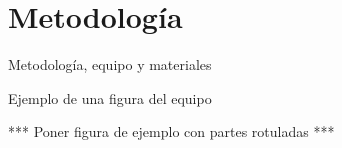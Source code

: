 \section{Metodología}
\label{sec:Metodologia}
Metodología, equipo y materiales

Ejemplo de una figura del equipo

*** Poner figura de ejemplo con partes rotuladas ***
